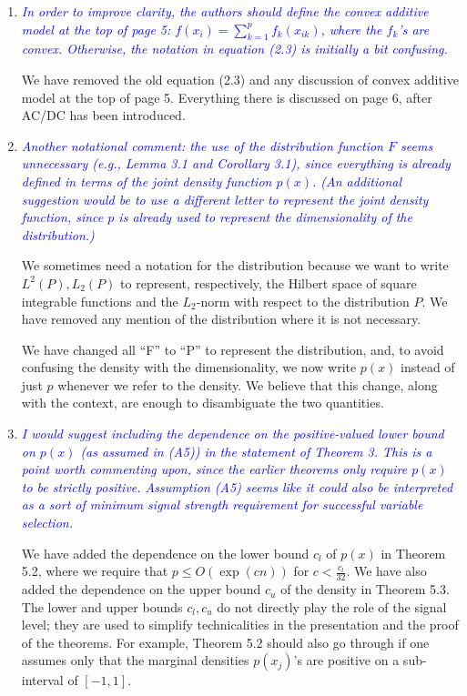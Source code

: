 \documentclass[pdftex,12pt]{article}
\def\rc#1{{\it\textcolor{blue}{#1}}\smallskip}
\begin{document}
\begin{enumerate}[(1)]
\item \rc{In order to improve clarity, the authors should define the convex
additive model at the top of page 5: $f(x_i) = \sum_{k=1}^p f_k(x_{ik})$, where the
$f_k$'s are convex.  Otherwise, the notation in equation (2.3) is
initially a bit confusing.}

We have removed the old equation (2.3) and any discussion of convex additive model at the top of page 5. Everything there is discussed on page 6, after AC/DC has been introduced.

\item \rc{Another notational comment: the use of the
distribution function $F$ seems unnecessary (e.g., Lemma 3.1 and
Corollary 3.1), since everything is already defined in terms of the
joint density function $p(x)$. (An additional suggestion would be to use
a different letter to represent the joint density function, since $p$ is
already used to represent the dimensionality of the distribution.)}

We sometimes need a notation for the distribution because we want to write $L^2(P), L_2(P)$ to represent, respectively, the Hilbert space of square integrable functions and the $L_2$-norm with respect to the distribution $P$. We have removed any mention of the distribution where it is not necessary.

We have changed all ``F'' to ``P'' to represent the distribution, and, to avoid confusing the density with the dimensionality, we now write $p(x)$ instead of just $p$ whenever we refer to the density. We believe that this change, along with the context, are enough to disambiguate the two quantities. 

\item \rc{I would suggest including the dependence on the positive-valued lower
bound on $p(x)$ (as assumed in (A5)) in the statement of Theorem 3. This
is a point worth commenting upon, since the earlier theorems only
require $p(x)$ to be strictly positive. Assumption (A5) seems like it
could also be interpreted as a sort of minimum signal strength
requirement for successful variable selection.}

We have added the dependence on the lower bound $c_l$ of $p(x)$ in Theorem 5.2, where we require that $p \leq O(\exp(cn))$ for $c < \frac{c_l}{32}$. We have also added the dependence on the upper bound $c_u$ of the density in Theorem 5.3. The lower and upper bounds $c_l, c_u$ do not directly play the role of the signal level; they are used to simplify technicalities in the presentation and the proof of the theorems. For example, Theorem 5.2 should also go through if one assumes only that the marginal densities $p(x_j)$'s are positive on a sub-interval of $[-1,1]$. 


\end{enumerate}
\end{document}
